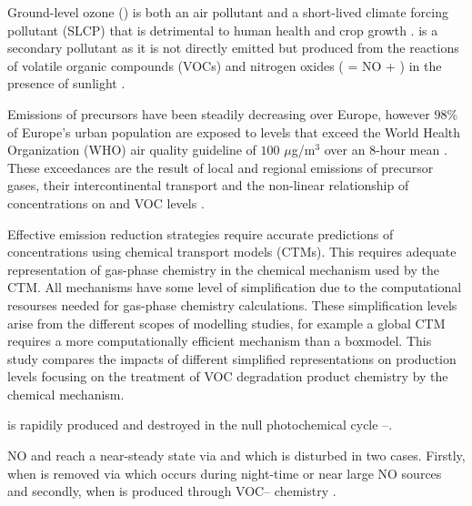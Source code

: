 Ground-level ozone () is both an air pollutant and a short-lived climate forcing pollutant (SLCP) that is detrimental to human health and crop growth \citep{AQEU:2013}. 
 is a secondary pollutant as it is not directly emitted but produced from the reactions of volatile organic compounds (VOCs) and nitrogen oxides ( = NO + ) in the presence of sunlight \citep{Atkinson:2000}.

Emissions of  precursors have been steadily decreasing over Europe, however $98$\% of Europe's urban population are exposed to levels that exceed the World Health Organization (WHO) air quality guideline of $100$ $\mu$g/m$^3$ over an $8$-hour mean \citep{WHO:2006}. 
These exceedances are the result of local and regional emissions of  precursor gases, their intercontinental transport and the non-linear relationship of  concentrations on  and VOC levels \citep{AQEU:2013}.

Effective emission reduction strategies require accurate predictions of  concentrations using chemical transport models (CTMs). 
This requires adequate representation of gas-phase chemistry in the chemical mechanism used by the CTM. 
All mechanisms have some level of simplification due to the computational resourses needed for gas-phase chemistry calculations. 
These simplification levels arise from the different scopes of modelling studies, for example a global CTM requires a more computationally efficient mechanism than a boxmodel. 
This study compares the impacts of different simplified representations on  production levels focusing on the treatment of VOC degradation product chemistry by the chemical mechanism.

 is rapidily produced and destroyed in the null photochemical cycle --. 
\begin{reactionlist}
\end{reactionlist}
NO and  reach a near-steady state via  and  which is disturbed in two cases. 
Firstly, when  is removed via  which occurs during night-time or near large NO sources and secondly, when  is produced through VOC-- chemistry \citep{Sillman:1999}.

